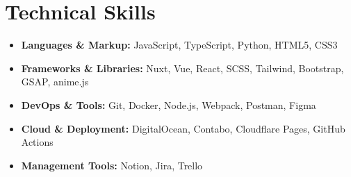 \section*{Technical Skills}
%
%
%
\begin{itemize}
    \item \textbf{Languages \& Markup:} JavaScript, TypeScript, Python, HTML5, CSS3
    \item \textbf{Frameworks \& Libraries:} Nuxt, Vue, React, SCSS, Tailwind, Bootstrap, GSAP, anime.js
    \item \textbf{DevOps \& Tools:} Git, Docker, Node.js, Webpack, Postman, Figma
    \item \textbf{Cloud \& Deployment:} DigitalOcean, Contabo, Cloudflare Pages, GitHub Actions
    \item \textbf{Management Tools:} Notion, Jira, Trello
\end{itemize}
